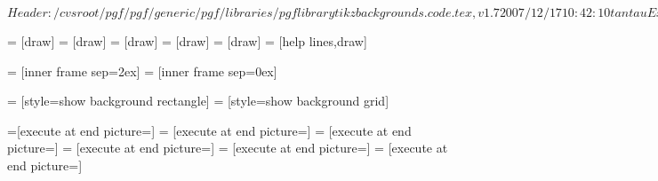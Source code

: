 %
%
%

\ProvidesFileRCS[v\pgfversion] $Header: /cvsroot/pgf/pgf/generic/pgf/libraries/pgflibrarytikzbackgrounds.code.tex,v 1.7 2007/12/17 10:42:10 tantau Exp $






= [draw]
=       [draw]
=    [draw]
=      [draw]
=     [draw]
=      [help lines,draw]

\def\tikz@framexsep{1ex}
\def\tikz@frameysep{1ex}

\def\tikz@outerframexsep{0ex}
\def\tikz@outerframeysep{0ex}



=     [inner frame sep=2ex]
=     [inner frame sep=0ex]




=                   [style=show background rectangle]
=                  [style=show background grid]

=[execute at end picture=\tikz@background@framed]
=      [execute at end picture=\tikz@background@top]
=   [execute at end picture=\tikz@background@bottom]
=     [execute at end picture=\tikz@background@left]
=    [execute at end picture=\tikz@background@right]
=     [execute at end picture=\tikz@background@grid]


